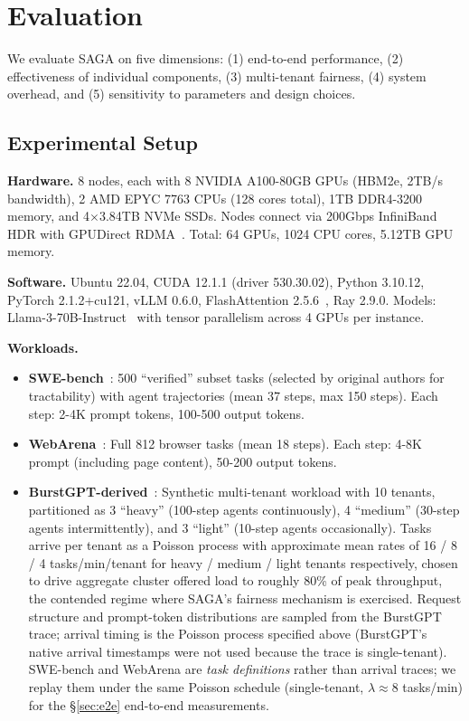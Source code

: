 \documentclass[sigconf]{acmart}
\newcommand{\sysname}{SAGA\xspace}
\begin{document}
\section{Evaluation}
\label{sec:eval}

We evaluate \sysname on five dimensions: (1) end-to-end performance, (2) effectiveness of individual components, (3) multi-tenant fairness, (4) system overhead, and (5) sensitivity to parameters and design choices.

\subsection{Experimental Setup}
\label{sec:setup}

\textbf{Hardware.} 8 nodes, each with 8 NVIDIA A100-80GB GPUs (HBM2e, 2TB/s bandwidth), 2 AMD EPYC 7763 CPUs (128 cores total), 1TB DDR4-3200 memory, and 4$\times$3.84TB NVMe SSDs. Nodes connect via 200Gbps InfiniBand HDR with GPUDirect RDMA~\cite{nvidia2018nvlink}. Total: 64 GPUs, 1024 CPU cores, 5.12TB GPU memory.

\textbf{Software.} Ubuntu 22.04, CUDA 12.1.1 (driver 530.30.02), Python 3.10.12, PyTorch 2.1.2+cu121, vLLM 0.6.0, FlashAttention 2.5.6~\cite{dao2023flashattention2}, Ray 2.9.0. Models: Llama-3-70B-Instruct~\cite{llama3modelcard} with tensor parallelism across 4 GPUs per instance.

\textbf{Workloads.}
\begin{itemize}[leftmargin=*,noitemsep]
    \item \textbf{SWE-bench}~\cite{jimenez2024swebench}: 500 ``verified'' subset tasks (selected by original authors for tractability) with agent trajectories (mean 37 steps, max 150 steps). Each step: 2-4K prompt tokens, 100-500 output tokens.
    \item \textbf{WebArena}~\cite{zhou2024webarena}: Full 812 browser tasks (mean 18 steps). Each step: 4-8K prompt (including page content), 50-200 output tokens.
    \item \textbf{BurstGPT-derived}~\cite{wang2024burstgpt}: Synthetic multi-tenant workload with 10 tenants, partitioned as 3 ``heavy'' (100-step agents continuously), 4 ``medium'' (30-step agents intermittently), and 3 ``light'' (10-step agents occasionally). Tasks arrive per tenant as a Poisson process with approximate mean rates of 16 / 8 / 4 tasks/min/tenant for heavy / medium / light tenants respectively, chosen to drive aggregate cluster offered load to roughly 80\% of peak throughput, the contended regime where SAGA's fairness mechanism is exercised. Request structure and prompt-token distributions are sampled from the BurstGPT trace; arrival timing is the Poisson process specified above (BurstGPT's native arrival timestamps were not used because the trace is single-tenant). SWE-bench and WebArena are \emph{task definitions} rather than arrival traces; we replay them under the same Poisson schedule (single-tenant, $\lambda \approx 8$ tasks/min) for the \S\ref{sec:e2e} end-to-end measurements.
\end{itemize}
\end{document}
